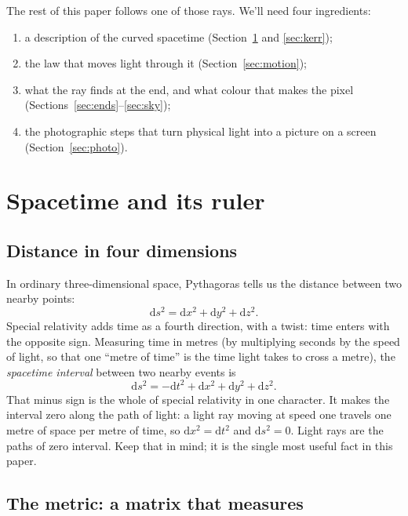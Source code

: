 \documentclass[11pt,a4paper]{article}
\newcommand{\dd}{\mathrm{d}}
\begin{document}
The rest of this paper follows one of those rays. We'll need four ingredients:
\begin{enumerate}
  \item a description of the curved spacetime (Section~\ref{sec:spacetime} and
        \ref{sec:kerr});
  \item the law that moves light through it (Section~\ref{sec:motion});
  \item what the ray finds at the end, and what colour that makes the pixel
        (Sections~\ref{sec:ends}--\ref{sec:sky});
  \item the photographic steps that turn physical light into a picture on a screen
        (Section~\ref{sec:photo}).
\end{enumerate}

\section{Spacetime and its ruler}\label{sec:spacetime}

\subsection{Distance in four dimensions}

In ordinary three-dimensional space, Pythagoras tells us the distance between two nearby
points:
\begin{equation}
  \dd s^2 = \dd x^2 + \dd y^2 + \dd z^2 .
\end{equation}
Special relativity adds time as a fourth direction, with a twist: time enters with the
opposite sign. Measuring time in metres (by multiplying seconds by the speed of light, so
that one ``metre of time'' is the time light takes to cross a metre), the
\emph{spacetime interval} between two nearby events is
\begin{equation}
  \dd s^2 = -\dd t^2 + \dd x^2 + \dd y^2 + \dd z^2 .
  \label{eq:minkowski}
\end{equation}
That minus sign is the whole of special relativity in one character. It makes the interval
zero along the path of light: a light ray moving at speed one travels one metre of space
per metre of time, so $\dd x^2 = \dd t^2$ and $\dd s^2 = 0$. Light rays are the paths of
zero interval. Keep that in mind; it is the single most useful fact in this paper.

\subsection{The metric: a matrix that measures}
\end{document}
